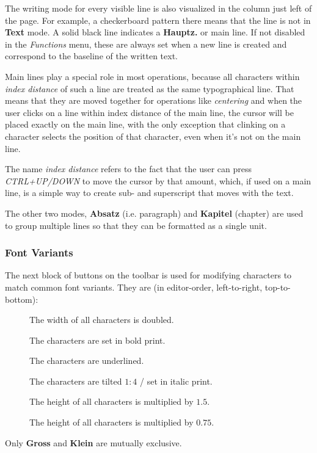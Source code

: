 The writing mode for every visible line is also visualized in the column just left of the page. For example, a checkerboard pattern there means that the line is not in \textbf{Text} mode. A solid black line indicates a \textbf{Hauptz.} or main line. If not disabled in the \textit{Functions} menu, these are always set when a new line is created and correspond to the baseline of the written text.

Main lines play a special role in most operations, because all characters within \textit{index distance} of such a line are treated as the same typographical line. That means that they are moved together for operations like \textit{centering} and when the user clicks on a line within index distance of the main line, the cursor will be placed exactly on the main line, with the only exception that clinking on a character selects the position of that character, even when it's not on the main line.

The name \textit{index distance} refers to the fact that the user can press \textit{CTRL+UP/DOWN} to move the cursor by that amount, which, if used on a main line, is a simple way to create sub- and superscript that moves with the text.

The other two modes, \textbf{Absatz} (i.e. paragraph) and \textbf{Kapitel} (chapter) are used to group multiple lines so that they can be formatted as a single unit.

\subsubsection{Font Variants} \label{sec:font-variants}
The next block of buttons on the toolbar is used for modifying characters to match common font variants. They are (in editor-order, left-to-right, top-to-bottom):

\newcommand{\key}[1]{\item[{\framebox[1.2cm]{\centering #1}}]}

\begin{description}
    \key{Breit}  The width of all characters is doubled.
    \key{Fett} The characters are set in bold print.
    \key{\vphantom{U}–––––} The characters are underlined.
    \key{Kursiv} The characters are tilted $1:4$ / set in italic print.
    \key{Gross} The height of all characters is multiplied by $1.5$.
    \key{Klein} The height of all characters is multiplied by $0.75$.
\end{description}

Only \textbf{Gross} and \textbf{Klein} are mutually exclusive.

